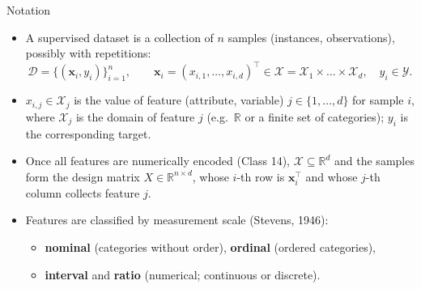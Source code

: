 \begin{frame}{Notation}
\begin{itemize}
\item A supervised dataset is a collection of $n$ samples (instances, observations), possibly with repetitions:
\[
\mathcal{D} = \{(\mathbf{x}_i, y_i)\}_{i=1}^{n}, \qquad \mathbf{x}_i = (x_{i,1}, \dots, x_{i,d})^{\top} \in \mathcal{X} = \mathcal{X}_1 \times \dots \times \mathcal{X}_d, \quad y_i \in \mathcal{Y}.
\]
\item $x_{i,j} \in \mathcal{X}_j$ is the value of feature (attribute, variable) $j \in \{1,\dots,d\}$ for sample $i$, where $\mathcal{X}_j$ is the domain of feature $j$ (e.g.\ $\mathbb{R}$ or a finite set of categories); $y_i$ is the corresponding target.
\item Once all features are numerically encoded (Class 14), $\mathcal{X} \subseteq \mathbb{R}^{d}$ and the samples form the design matrix $X \in \mathbb{R}^{n \times d}$, whose $i$-th row is $\mathbf{x}_i^{\top}$ and whose $j$-th column collects feature $j$.
\item Features are classified by measurement scale (Stevens, 1946):
\begin{itemize}
\item \textbf{nominal} (categories without order), \textbf{ordinal} (ordered categories),
\item \textbf{interval} and \textbf{ratio} (numerical; continuous or discrete).
\end{itemize}
\end{itemize}
\coursefooter
\end{frame}

